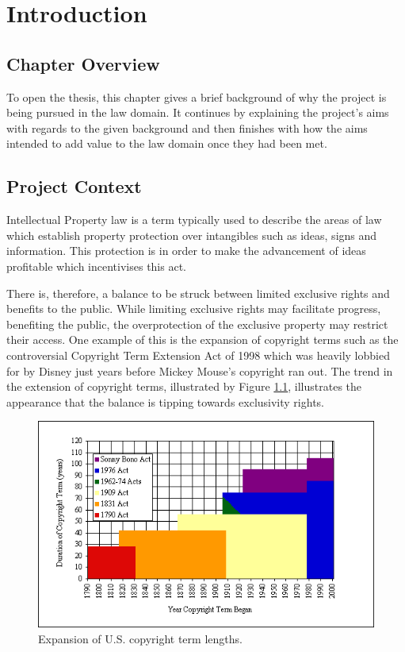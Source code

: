 \chapter{Introduction}\label{sec:intro}
	\section{Chapter Overview}
		To open the thesis, this chapter gives a brief background of why the project is being pursued in the law domain. It continues by explaining the project's aims with regards to the given background and then finishes with how the aims intended to add value to the law domain once they had been met. 
	\section{Project Context}\label{sec:context}
		Intellectual Property law is a term typically used to describe the areas of law which establish property protection over intangibles such as ideas, signs and information. This protection is in order to make the advancement of ideas profitable which incentivises this act\cite{ip_edu_bently}.
			
		There is, therefore, a balance to be struck between limited exclusive rights and benefits to the public. While limiting exclusive rights may facilitate progress, benefiting the public, the overprotection of the exclusive property may restrict their access\cite{handbook_ip_hr_geiger}. One example of this is the expansion of copyright terms such as the controversial Copyright Term Extension Act of 1998 which was heavily lobbied for by Disney just years before Mickey Mouse's copyright ran out\cite{mickey_mouse_grzelak}. The trend in the extension of copyright terms, illustrated by Figure \ref{fig:ext_us_cop}, illustrates the appearance that the balance is tipping towards exclusivity rights. 

		\begin{figure}[h]
    		\centering
    		\includegraphics[width=0.7\linewidth]{resources/images/extention_of_us_copyright.png}
    		\caption{Expansion of U.S. copyright term lengths\cite{copyright_term_length_graph_bell}.}
    		\label{fig:ext_us_cop}
		\end{figure}
			
